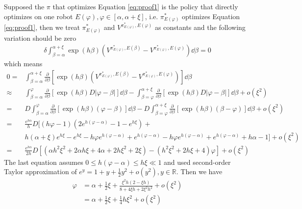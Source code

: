 Supposed the $\pi$ that optimizes Equation \eqref{eq:proof1} is the policy that directly optimizes on one robot $E(\varphi), \varphi \in [\alpha, \alpha+\xi]$, i.e. $\pi^*_{E(\varphi)}$ optimizes Equation \eqref{eq:proof1}, then we treat $\pi^*_{E(\varphi)}$ and $V^{\pi^*_{E(\varphi)},E(\varphi)}$ as constants and the following variation should be zero
\begin{equation}
\begin{split}
    \delta \int_{\beta=\alpha}^{\alpha+\xi} \exp(h\beta)
    (V^{\pi^*_{E(\varphi)},E(\beta)} - V^{\pi^*_{E(\varphi)},E(\varphi)})  \dd{\beta} = 0
\end{split}
\end{equation}
which means
\begin{equation}
\begin{split}
    0 = & \int_{\beta=\alpha}^{\alpha+\xi} \frac{\partial}{\partial \beta} [ \exp(h\beta)
    (V^{\pi^*_{E(\varphi)},E(\beta)} - V^{\pi^*_{E(\varphi)},E(\varphi)}) ]  \dd{\beta}  \\ 
    \approx & \int_{\beta=\alpha}^{\varphi} \frac{\partial}{\partial \beta} [\exp(h\beta) D |\varphi-\beta| ] \dd{\beta} - \int_{\beta=\varphi}^{\alpha+\xi} \frac{\partial}{\partial \beta} [\exp(h\beta) D |\varphi-\beta| ] \dd{\beta} + o(\xi^2) \\
    = & D \int_{\beta=\alpha}^{\varphi} \frac{\partial}{\partial \beta} [\exp(h\beta) (\varphi - \beta) ] \dd{\beta} - D \int_{\beta=\varphi}^{\alpha+\xi} \frac{\partial}{\partial \beta} [\exp(h\beta) (\beta - \varphi) ] \dd{\beta} + o(\xi^2) \\
    = & \frac{e^{h\alpha}}{h} D [(h\varphi-1)(2e^{h(\varphi-\alpha)} - 1 - e^{h\xi}) + \\ & h(\alpha+\xi)e^{h\xi} - e^{h\xi} - h\varphi e^{h(\varphi-\alpha)} + e^{h(\varphi-\alpha)} - h\varphi e^{h(\varphi-\alpha)} + e^{h(\varphi-\alpha)} + h\alpha - 1 ] + o(\xi^2) \\
    = & \frac{e^{h\alpha}}{2h} D [(\alpha h^{2} \xi^{2} + 2 \alpha h \xi + 4 \alpha  + 2 h \xi^{2}  + 2 \xi) - (h^{2} \xi^{2} + 2 h \xi +4)\varphi ] +  o(\xi^2) 
\end{split}
\end{equation}
The last equation assumes $0 \le h(\varphi - \alpha) \le h\xi \ll 1$ and used second-order Taylor approximation of $e^y = 1 + y + \frac{1}{2}y^2 + o(y^2), y\in \mathbb{R}$. 
Then we have
\begin{equation}
\begin{split}
    \varphi & = \alpha + \frac{1}{2} \xi + \frac{\xi^2 h (2-\xi h)}{8 + 4\xi h + 2\xi^2 h^2} + o(\xi^2) \\
    & = \alpha + \frac{1}{2}\xi + \frac{1}{4} h\xi^2 + o(\xi^2)
\end{split}    
\end{equation}

